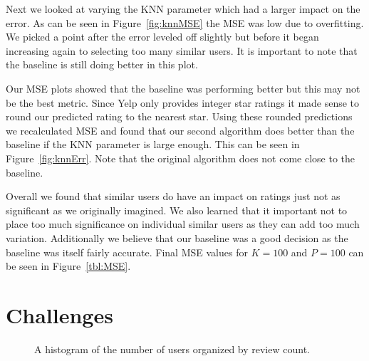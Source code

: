 \documentclass[10pt,twocolumn,letterpaper]{article}
\begin{document}
Next we looked at varying the KNN parameter which had a larger impact on the error. As can be seen in Figure~\ref{fig:knnMSE} the MSE was low due to overfitting. We picked a point after the error leveled off slightly but before it began increasing again to selecting too many similar users. It is important to note that the baseline is still doing better in this plot.

Our MSE plots showed that the baseline was performing better but this may not be the best metric. Since Yelp only provides integer star ratings it made sense to round our predicted rating to the nearest star. Using these rounded predictions we recalculated MSE and found that our second algorithm does better than the baseline if the KNN parameter is large enough. This can be seen in Figure~\ref{fig:knnErr}. Note that the original algorithm does not come close to the baseline.

Overall we found that similar users do have an impact on ratings just not as significant as we originally imagined. We also learned that it important not to place too much significance on individual similar users as they can add too much variation. Additionally we believe that our baseline was a good decision as the baseline was itself fairly accurate. Final MSE values for $K=100$ and $P=100$ can be seen in Figure~\ref{tbl:MSE}.


\section{Challenges}

\begin{figure}[t]
\begin{center}
\end{center}
   \caption{A histogram of the number of users organized by review count.}
\label{fig:usrCnt}
\end{figure}
\end{document}

